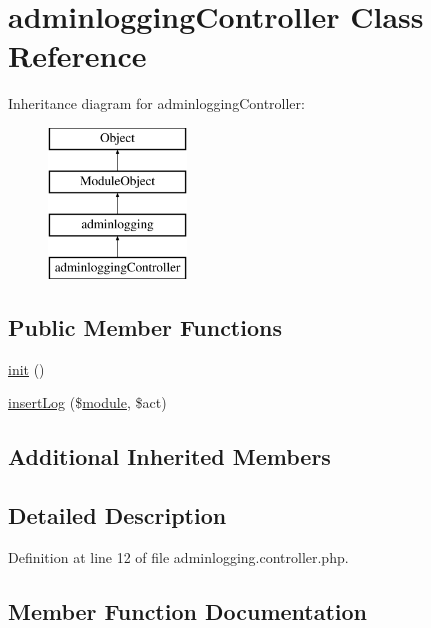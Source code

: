 \hypertarget{classadminloggingController}{}\section{adminlogging\+Controller Class Reference}
\label{classadminloggingController}
Inheritance diagram for adminlogging\+Controller\+:\begin{figure}[H]
\begin{center}
\leavevmode
\includegraphics[height=4.000000cm]{classadminloggingController}
\end{center}
\end{figure}
\subsection*{Public Member Functions}
\begin{DoxyCompactItemize}
\item 
\hyperlink{classadminloggingController_a2b276c4c5c3514a7020a5ae427c62430}{init} ()
\item 
\hyperlink{classadminloggingController_aaf6283ad1e303a0b8f475013f442c20a}{insert\+Log} (\$\hyperlink{classmodule}{module}, \$act)
\end{DoxyCompactItemize}
\subsection*{Additional Inherited Members}


\subsection{Detailed Description}


Definition at line 12 of file adminlogging.\+controller.\+php.



\subsection{Member Function Documentation}
\hypertarget{classadminloggingController_a2b276c4c5c3514a7020a5ae427c62430}{}\label{classadminloggingController_a2b276c4c5c3514a7020a5ae427c62430} 
